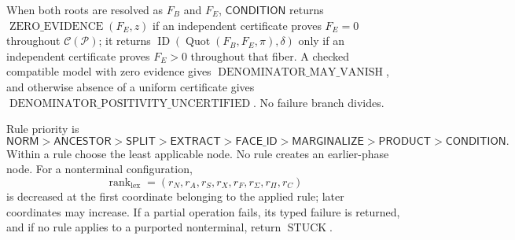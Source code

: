 When both roots are resolved as \(F_B\) and \(F_E\), \(\mathsf{CONDITION}\) returns \(\operatorname{ZERO\_EVIDENCE}(F_E,z)\) if an independent certificate proves \(F_E=0\) throughout \(\mathcal C(\mathcal P)\); it returns
\(\operatorname{ID}(\operatorname{Quot}(F_B,F_E,\pi),\delta)\) only if an independent certificate proves \(F_E>0\) throughout that fiber.  A checked compatible model with zero evidence gives \(\operatorname{DENOMINATOR\_MAY\_VANISH}\), and otherwise absence of a uniform certificate gives \(\operatorname{DENOMINATOR\_POSITIVITY\_UNCERTIFIED}\).  No failure branch divides.

Rule priority is
\[
\mathsf{NORM}>\mathsf{ANCESTOR}>\mathsf{SPLIT}>\mathsf{EXTRACT}>
\mathsf{FACE\_ID}>\mathsf{MARGINALIZE}>\mathsf{PRODUCT}>\mathsf{CONDITION}.
\]
Within a rule choose the least applicable node.  No rule creates an earlier-phase node.  For a nonterminal configuration,
\[
\operatorname{rank}_{\mathrm{lex}}=(r_N,r_A,r_S,r_X,r_F,r_\Sigma,r_\Pi,r_C)
\]
is decreased at the first coordinate belonging to the applied rule; later coordinates may increase.  If a partial operation fails, its typed failure is returned, and if no rule applies to a purported nonterminal, return \(\operatorname{STUCK}\).